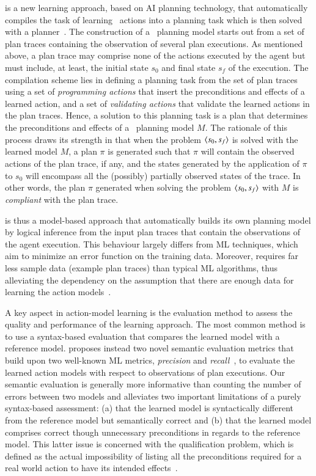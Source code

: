 \textcolor[rgb]{1.00,0.00,0.00}{\FAMA is a new learning approach, based on AI planning technology, that automatically compiles the task of learning \strips\ actions into a planning task which is then solved with a planner~\cite{aineto2018learning}. The construction of a \strips\ planning model starts out from a set of plan traces containing the observation of several plan executions. As mentioned above, a plan trace may comprise none of the actions executed by the agent but must include, at least, the initial state $s_0$ and final state $s_f$ of the execution. The compilation scheme lies in defining a planning task from the set of plan traces using a set of \emph{programming actions} that insert the preconditions and effects of a learned action, and a set of \emph{validating actions} that validate the learned actions in the plan traces. Hence, a solution to this planning task is a plan that determines the preconditions and effects of a \strips\ planning model $M$. The rationale of this process draws its strength in that when the problem ${\langle s_0,s_f \rangle}$ is solved with the learned model $M$, a plan $\pi$ is generated such that $\pi$ will contain the observed actions of the plan trace, if any, and the states generated by the application of $\pi$ to $s_0$ will encompass all the (possibly) partially observed states of the trace. In other words, the plan $\pi$ generated when solving the problem ${\langle s_0,s_f \rangle}$ with $M$ is \emph{compliant} with the plan trace. }

\FAMA is thus a model-based approach that automatically builds its own planning model by logical inference from the input plan traces that contain the observations of the agent execution. This behaviour largely differs from ML techniques, which aim to minimize an error function on the training data. Moreover, \FAMA requires far less sample data (example plan traces) than typical ML algorithms, thus alleviating the dependency on the assumption that there are enough data for learning the action models~\cite{Zhuo15}.

A key aspect in action-model learning is the evaluation method to assess the quality and performance of the learning approach. The most common method is to use a syntax-based evaluation that compares the learned model with a reference model. \FAMA proposes instead two novel semantic evaluation metrics that build upon two well-known ML metrics, {\em precision} and {\em recall}~\cite{davis2006relationship}, to evaluate the learned action models with respect to observations of plan executions. Our semantic evaluation is generally more informative than counting the number of errors between two models and alleviates two important limitations of a purely syntax-based assessment: (a) that the learned model is syntactically different from the reference model but semantically correct and (b) that the learned model comprises correct though unnecessary preconditions in regards to the reference model. This latter issue is concerned with the qualification problem, which is defined as the actual impossibility of listing all the preconditions required for a real world action to have its intended effects~\cite{GinsbergS88}.

